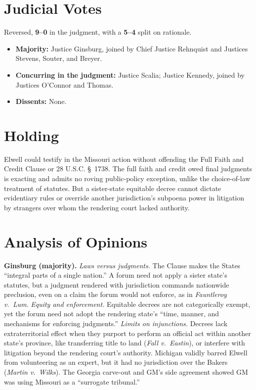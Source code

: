\documentclass[12pt]{article}
\begin{document}
\section{Judicial Votes}

Reversed, \textbf{9--0} in the judgment, with a \textbf{5--4} split on rationale.
\begin{itemize}
\item \textbf{Majority:} Justice Ginsburg, joined by Chief Justice Rehnquist and Justices Stevens, Souter, and Breyer.
\item \textbf{Concurring in the judgment:} Justice Scalia; Justice Kennedy, joined by Justices O'Connor and Thomas.
\item \textbf{Dissents:} None.
\end{itemize}

\section{Holding}

Elwell could testify in the Missouri action without offending the Full Faith and Credit Clause or 28 U.S.C. \S~1738. The full faith and credit owed final judgments is exacting and admits no roving public-policy exception, unlike the choice-of-law treatment of statutes. But a sister-state equitable decree cannot dictate evidentiary rules or override another jurisdiction's subpoena power in litigation by strangers over whom the rendering court lacked authority.

\section{Analysis of Opinions}

\textbf{Ginsburg (majority).} \textit{Laws versus judgments.} The Clause makes the States ``integral parts of a single nation.'' A forum need not apply a sister state's statutes, but a judgment rendered with jurisdiction commands nationwide preclusion, even on a claim the forum would not enforce, as in \textit{Fauntleroy v.\ Lum}. \textit{Equity and enforcement.} Equitable decrees are not categorically exempt, yet the forum need not adopt the rendering state's ``time, manner, and mechanisms for enforcing judgments.'' \textit{Limits on injunctions.} Decrees lack extraterritorial effect when they purport to perform an official act within another state's province, like transferring title to land (\textit{Fall v.\ Eastin}), or interfere with litigation beyond the rendering court's authority. Michigan validly barred Elwell from volunteering as an expert, but it had no jurisdiction over the Bakers (\textit{Martin v.\ Wilks}). The Georgia carve-out and GM's side agreement showed GM was using Missouri as a ``surrogate tribunal.''
\end{document}

